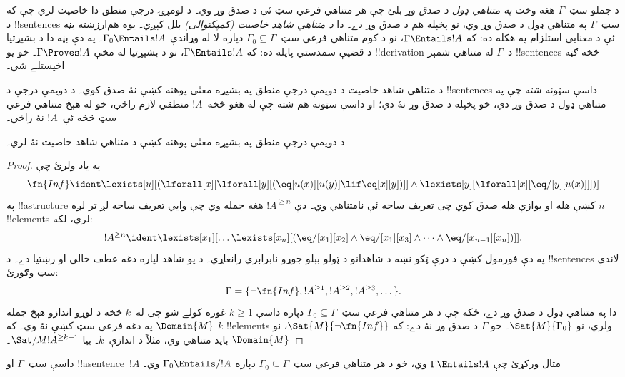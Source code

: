 \documentclass[../../../include/open-logic-section]{subfiles}
\begin{document}


\begin{explain}
د جملو سټ~$\Gamma$ هغه وخت \emph{په متناهي ډول د صدق وړ} بلئ چې هر
متناهي فرعي سټ ئې د صدق وړ وي۔ د لومړۍ درجې منطق دا خاصيت لري چې
که د !!{sentence}s سټ~$\Gamma$ په متناهي ډول د صدق وړ وي، نو پخپله
هم د صدق وړ دے۔ دا \emph{د متناهي شاهد خاصيت (کمپکتوالی)} بلل کېږي۔ يوه هم‌ارزښته بڼه
ئې د معنايي استلزام په هکله ده: که $\Gamma \Entails !A$، نو د کوم
متناهي فرعي سټ~$\Gamma_0 \subseteq \Gamma$ دپاره لا له وړاندې
$\Gamma_0 \Entails !A$۔ په دې بڼه دا د بشپړتيا د قضيې سمدستي پايله
ده: که $\Gamma \Entails !A$، نو د بشپړتيا له مخې $\Gamma \Proves !A$۔
خو يو !!{derivation} د~$\Gamma$ له متناهي شمېر !!{sentence}s څخه
ګټه اخيستلے شي۔

د متناهي شاهد خاصيت د دويمې درجې منطق په بشپړه معنٰی پوهنه کښې نۀ صدق کوي۔ د دويمې درجې د
!!{sentence}s داسې سټونه شته چې په متناهي ډول د صدق وړ دي، خو
پخپله د صدق وړ نۀ دي؛ او داسې سټونه هم شته چې له هغو څخه~$!A$
منطقي لازم راځي، خو له هېڅ متناهي فرعي سټ څخه ئې~$!A$ نۀ راځي۔
\end{explain}


\begin{thm}
د دويمې درجې منطق په بشپړه معنٰی پوهنه کښې د متناهي شاهد خاصيت نۀ لري۔
\end{thm}

\begin{proof}
په ياد ولرئ چې
\[
\fn{Inf} \ident \lexists[u][(\lforall[x][\lforall[y][(\eq[u(x)][u(y)]
      \lif \eq[x][y])]] \land \lexists[y][\lforall[x][\eq/[y][u(x)]]])]
\]
په !!a{structure} کښې هله او يوازې هله صدق کوي چې تعريف ساحه ئې
نامتناهي وي۔ دې $!A^{\ge n}$ هغه جمله وي چې وايي تعريف ساحه لږ تر
لږه $n$ !!{element}s لري، لکه:
\[
!A^{\ge n} \ident \lexists[x_1][\dots\lexists[x_n][(\eq/[x_1][x_2]
    \land \eq/[x_1][x_3] \land \dots \land \eq/[x_{n-1}][x_n])]].
\]
په دې فورمول کښې د درې ټکو نښه د شاهدانو د ټولو بېلو جوړو نابرابري رانغاړي۔ د يو شاهد لپاره دغه عطف خالي او رښتيا دے۔
د !!{sentence}s لاندې سټ وګورئ:
\[
\Gamma = \{\lnot \fn{Inf}, !A^{\ge 1}, !A^{\ge 2}, !A^{\ge 3}, \dots\}.
\]
دا په متناهي ډول د صدق وړ دے، ځکه چې د هر متناهي فرعي سټ~$\Gamma_0
\subseteq \Gamma$ دپاره داسې $k \ge 1$ غوره کولے شو چې له~$k$ څخه د لوړو
اندازو هېڅ جمله په دغه فرعي سټ کښې نۀ وي۔
که $\Domain{M}$
$k$ !!{element}s ولري، نو $\Sat{M}{\Gamma_0}$۔ خو $\Gamma$ د صدق وړ
نۀ دے: که $\Sat{M}{\lnot \fn{Inf}}$، نو $\Domain{M}$ بايد متناهي وي،
مثلاً د اندازې~$k$۔ بيا $\Sat/{M}{!A^{\ge k+1}}$۔
\end{proof}

\begin{prob}
داسې سټ~$\Gamma$ او !!a{sentence}~$!A$ مثال ورکړئ چې
$\Gamma \Entails !A$ وي، خو د هر متناهي فرعي سټ~$\Gamma_0 \subseteq
\Gamma$ دپاره $\Gamma_0 \Entails/ !A$ وي۔
\end{prob}
\end{document}
